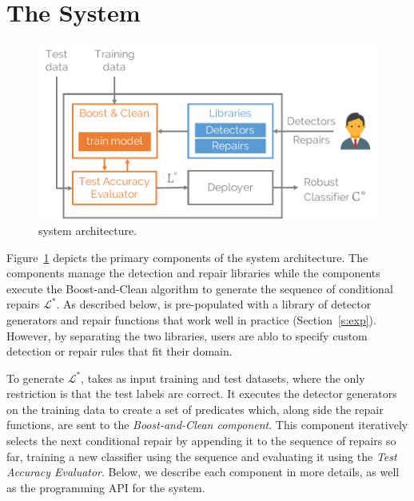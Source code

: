 \section{The \sys System}\label{s:arch}
 
\begin{figure}[h]
\centering
\includegraphics[width=0.8\columnwidth]{figures/arch.pdf}
\caption{\sys system architecture.}
\label{f:arch}
\end{figure}

Figure~\ref{f:arch} depicts the primary components of the system architecture. The  components manage the detection and repair libraries while the  components execute the Boost-and-Clean algorithm to generate the sequence of conditional repairs $\mathcal{L}^*$.  As described below, \sys is pre-populated with a library of detector generators and repair functions that work well in practice (Section~\ref{s:exp}).  However, by separating the two libraries, users are ablo to specify custom detection or repair rules that fit their domain.

To generate $\mathcal{L}^*$, \sys takes as input training and test datasets, where the only restriction is that the test labels are correct.  It executes the detector generators on the training data to create a set of predicates which, along side the repair functions, are sent to the {\it Boost-and-Clean component}.  This component iteratively selects the next conditional repair by appending it to the sequence of repairs so far, training a new classifier using the sequence and evaluating it using the {\it Test Accuracy Evaluator}.  Below, we describe each component in more details, as well as the programming API for the system.

